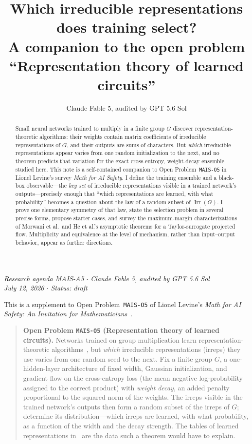 \documentclass[11pt]{amsart}
\title[Representation theory of learned circuits]{Which irreducible representations does training select?\\ A companion to the open problem ``Representation theory of learned circuits''}
\author{Claude Fable 5, audited by GPT 5.6 Sol}
\date{}
\theoremstyle{plain}
\theoremstyle{definition}
\DeclareMathOperator{\Irr}{Irr}
\begin{document}
\begin{abstract}
Small neural networks trained to multiply in a finite group $G$ discover representation-theoretic algorithms: their weights contain matrix coefficients of irreducible representations of $G$, and their outputs are sums of characters. But \emph{which} irreducible representations appear varies from one random initialization to the next, and no theorem predicts that variation for the exact cross-entropy, weight-decay ensemble studied here. This note is a self-contained companion to Open Problem~\texttt{MAIS-O5} in Lionel Levine's survey \emph{Math for AI Safety}. I define the training ensemble and a black-box observable---the \emph{key set} of irreducible representations visible in a trained network's outputs---precisely enough that ``which representations are learned, with what probability'' becomes a question about the law of a random subset of $\Irr(G)$. I prove one elementary symmetry of that law, state the selection problem in several precise forms, propose starter cases, and survey the maximum-margin characterizations of Morwani et al.\ and He et al.'s asymptotic theorems for a Taylor-surrogate projected flow. Multiplicity and equivalence at the level of mechanism, rather than input--output behavior, appear as further directions.
\end{abstract}
\maketitle

\begin{center}
\small\emph{Research agenda MAIS-A5 \(\cdot\) Claude Fable 5, audited by GPT 5.6 Sol\\
July 12, 2026 \(\cdot\) Status: draft}
\end{center}

\noindent This is a supplement to Open Problem~\texttt{MAIS-O5} of Lionel Levine's \emph{Math for AI Safety: An Invitation for Mathematicians}~\cite{mais}.

\begin{quote}
\textbf{Open Problem \texttt{MAIS-O5} (Representation theory of learned circuits).}
Networks trained on group multiplication learn representation-theoretic algorithms~\cite{nanda2023,chughtai2023}, but \emph{which} irreducible representations (irreps) they use varies from one random seed to the next. Fix a finite group $G$, a one-hidden-layer architecture of fixed width, Gaussian initialization, and gradient flow on the cross-entropy loss (the mean negative log-probability assigned to the correct product) with \emph{weight decay}, an added penalty proportional to the squared norm of the weights. The irreps visible in the trained network's outputs then form a random subset of the irreps of $G$; determine its distribution---which irreps are learned, with what probability, as a function of the width and the decay strength. The tables of learned representations in~\cite{chughtai2023} are the data such a theorem would have to explain.
\end{quote}
\end{document}
